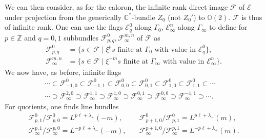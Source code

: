 \documentclass[12pt]{article}
\theoremstyle{definition}
\theoremstyle{remark}
\numberwithin{theorem}{section}
\def\bZ{{\mathbb {Z}}}
\def\bC{{\mathbb {C}}}
\def\bO{{\mathbb {O}}}
\def\pE{{\mathcal E}}
\def\pF{{\mathcal F}}
\begin{document}
We can then consider, as for the caloron, the infinite rank direct image $\pF$ of $\pE$ under projection  from the generically $\bC^*$-bundle $Z_0 $ (not  $Z_0'$) to $\bO(2)$.  $\pF$ is thus of infinite rank. One   can use the
flags $\pE^0_q $ along $\Gamma_0$, $\pE_\infty^n$ along $\Gamma_\infty$
to define for $p\in \bZ$ and $q= 0,1$ subbundles $\pF^0_{p,q},
\pF_\infty^{m,n}$ of $\pF$ as
\begin{align*}
\pF^0_{ p,q} &=\{s\in \pF\mid \xi^{p}s \text{ finite at }{\Gamma}_0
                         \text{ with value in } \pE^0_q  \}, \\
\pF_\infty^{m,n} &=\{s\in \pF\mid \xi^{-m}s \text{ finite at } {\Gamma}_\infty
                           \text{ with value in } \pE_\infty^n \}.
\end{align*}
We now have, as before, infinite flags
\begin{equation}\label{infiniteflags-1}\begin{gathered}
\cdots\subset \pF^0_{-1,0}\subset \pF^0_{-1,1} \subset \pF^0_{0,0} \subset \pF^0_{0,1} \subset \pF^0_{1,0} \subset \pF^0_{1,1} \subset\cdots\phantom{-.}\\
\cdots\supset \pF_\infty^{2,0}\supset \pF_\infty^{1,1} \supset \pF_\infty^{1,0} \supset \pF_\infty^{0,1} \supset \pF_\infty^{0,0} \supset \pF_\infty^{-1,1} \supset\cdots.
\end{gathered}\end{equation}
%
For  quotients, one finds line bundles
\begin{align} \pF^0_{ p,1}/ \pF^0_{ p,0} =  L^{p\ell +\lambda_+}(-m),&\quad \pF^0_{ p+1,0}/ \pF^0_{ p,1} =  L^{p\ell +\lambda_-}(m),\\
 \pF_\infty^{p,1}/\pF_\infty^{p,0}= L^{-p\ell+\lambda_-}(-m),&\quad \pF_\infty^{p+1,0}/\pF_\infty^{p,1}= L^{-p\ell+\lambda_+}(m).\end{align}
\end{document}
